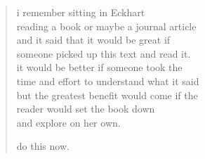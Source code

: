 
\begin{verse}
i remember sitting in Eckhart\\
reading a book or maybe a journal article\\
and it said that it would be great if\\
someone picked up this text and read it.\\
it would be better if someone took the \\
time and effort to understand what it said\\
but the greatest benefit would come if the\\
reader would set the book down \\
and explore on her own.

do this now.
\end{verse}
